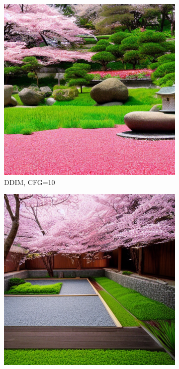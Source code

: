 \documentclass[10pt,twocolumn]{article}
\begin{document}
\begin{figure}[H]
    \centering
    \begin{subfigure}{0.32\textwidth}
        \includegraphics[width=\linewidth]{figures/baseline_ddim_cfg10.0_512_prompt8_20250712_111309.png}
        \caption{DDIM, CFG=10}
    \end{subfigure}
    \begin{subfigure}{0.32\textwidth}
        \includegraphics[width=\linewidth]{figures/baseline_dpm++_2m_cfg10.0_512_prompt8_20250712_112021.png}

\end{subfigure}
\end{figure}
\end{document}
